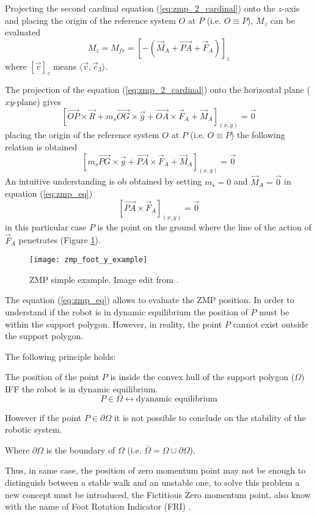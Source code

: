 Projecting the second cardinal equation (\ref{eq:zmp_2_cardinal}) onto the $z$-axis and placing the
origin of the reference system $O$ at $P$ (i.e. $O \equiv P$), $M_z$ can be evaluated
\[
M_z = M_{fr} = [-(\vec{M}_A + \vec{PA} + \vec{F}_A)]_z
\]
where $[\vec{v}]_z$ means $\langle \vec{v},\vec{e}_3 \rangle$.
\par
The projection of the equation (\ref{eq:zmp_2_cardinal}) onto the horizontal plane ($xy$-plane) gives
\[
\left[\vec{OP} \times \vec{R} + m_s \vec{OG} \times \vec{g} + \vec{OA} \times \vec{F}_A + \vec{M}_A\right]_{(x,y)} = \vec{0}
\]
placing the origin of the reference system $O$ at $P$ (i.e. $O \equiv P$) the following relation is
obtained
\begin{equation}
  \label{eq:zmp_eq}
  \left[ m_s \vec{PG} \times \vec{g} + \vec{PA} \times \vec{F}_A + \vec{M}_A\right]_{(x,y)} = \vec{0}
\end{equation}
An intuitive understanding is ob obtained by setting $m_s = 0$ and $\vec{M}_A = \vec{0}$ in equation
(\ref{eq:zmp_eq})
\[
\left[\vec{PA} \times \vec{F}_A\right]_{(x,y)} = \vec{0}
\]
in this particular case $P$ is the point on the ground where the line of the action of $\vec{F}_A$
penetrates (Figure \ref{fig:zmp_foot_y_example}).
\begin{figure}[!ht]
  \centering
  \texttt{[image: zmp\_foot\_y\_example]}
  \caption{ZMP simple example. Image edit from \cite{Vukobratov2004}. \label{fig:zmp_foot_y_example}}
\end{figure}
The equation (\ref{eq:zmp_eq}) allows to evaluate the ZMP position. In order to understand if the robot
is in dynamic equilibrium the position of $P$ must be within the support polygon. However, in reality, the
point $P$ cannot exist outside the support polygon.
\par
The following principle holds:
\begin{principle}
  \label{principle:zmp}
  The position of the point $P$ is inside the convex hull of the support polygon ($\Omega$)
  IFF the robot is in dynamic equilibrium.
  \[
  P \in \Omega \longleftrightarrow \text{dyanamic equilibrium}
  \]
  \par
  However if the point $P \in \partial \Omega$ it is not possible to conclude on the stability of the robotic system.
  \par
  Where $\partial \Omega$ is the boundary of $\Omega$ (i.e. $\bar{\Omega} = \Omega \cup \partial \Omega$).
\end{principle}
Thus, in same case, the position of zero momentum point may not be enough to distinguish between a
stable walk and an unstable one, to solve this problem a new concept must be introduced, the
Fictitious Zero momentum point, also know with the name of Foot Rotation Indicator (FRI)
\cite{Goswami1999}.

